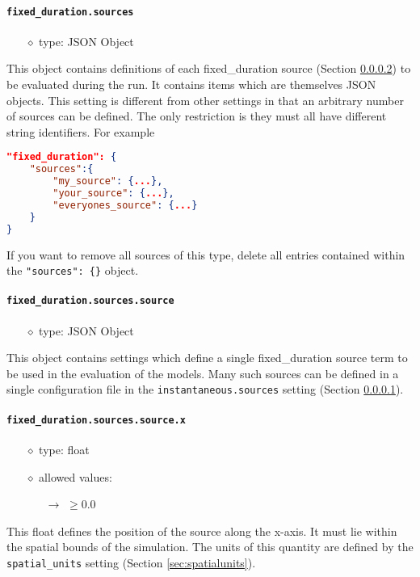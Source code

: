 \documentclass[]{article}
\def\code#1{\texttt{#1}}
\begin{document}
\paragraph{\code{fixed\_duration.sources}}\label{sec:fixsources}
\begin{itemize}
    \item[$\diamond$] type: JSON Object 
\end{itemize}
This object contains definitions of each fixed\_duration source (Section
\ref{sec:fixsource}) to be evaluated during the run. It contains items which
are themselves JSON objects. This setting is different from other settings in
that an arbitrary number of sources can be defined. The only restriction is they
must all have different string identifiers. For example\\
\begin{lstlisting}[language=json,firstnumber=1]
"fixed_duration": {
    "sources":{
        "my_source": {...},
        "your_source": {...},
        "everyones_source": {...}
    }
}
\end{lstlisting}
\medskip

\noindent If you want to remove all sources of this type, delete all entries
contained within the \code{"sources": \{\}} object.

\paragraph{\code{fixed\_duration.sources.source}}\label{sec:fixsource}
\begin{itemize}
    \item[$\diamond$] type: JSON Object 
\end{itemize}
This object contains settings which define a single fixed\_duration source term to
be used in the evaluation of the models. Many such sources can be defined in a
single configuration file in the \code{instantaneous.sources} setting (Section
\ref{sec:fixsources}).

\paragraph{\code{fixed\_duration.sources.source.x}}\label{sec:fixsourcex}
\begin{itemize}
    \item[$\diamond$] type: float 
    \item[$\diamond$] allowed values:
    \begin{itemize}
        \item[$\rightarrow$] $\geq0.0$
    \end{itemize}
\end{itemize}
This float defines the position of the source along the x-axis. It must lie
within the spatial bounds of the simulation. The units of this quantity are
defined by the \code{spatial\_units} setting (Section \ref{sec:spatialunits}).
\end{document}
